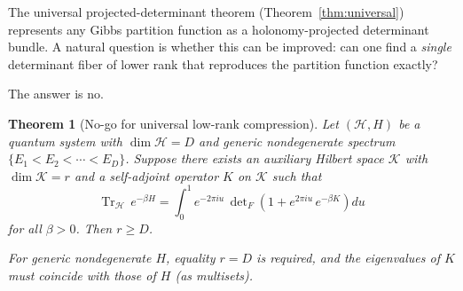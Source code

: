 \documentclass[12pt]{article}
\theoremstyle{plain}
\newtheorem{theorem}{Theorem}[section]
\theoremstyle{definition}
\numberwithin{equation}{section}
\DeclareMathOperator{\Tr}{Tr}
\begin{document}
The universal projected-determinant theorem (Theorem~\ref{thm:universal})
represents any Gibbs partition function as a holonomy-projected
determinant bundle.  A natural question is whether this can be
improved: can one find a \emph{single} determinant fiber of
lower rank that reproduces the partition function exactly?

The answer is no.

\begin{theorem}[No-go for universal low-rank compression]\label{thm:nogo}
Let $(\mathcal{H},H)$ be a quantum system with $\dim\mathcal{H}=D$
and generic nondegenerate spectrum $\{E_1<E_2<\cdots<E_D\}$.
Suppose there exists an auxiliary Hilbert space $\mathcal{K}$ with
$\dim\mathcal{K}=r$ and a self-adjoint operator $K$ on $\mathcal{K}$
such that
\begin{equation}\label{eq:lowrank}
\Tr_{\mathcal{H}}\,e^{-\beta H}
= \int_0^1 e^{-2\pi iu}\,
\det\nolimits_F\!\left(1+e^{2\pi iu}\,e^{-\beta K}\right)du
\end{equation}
for all $\beta>0$.  Then $r\geq D$.

For generic nondegenerate $H$, equality $r=D$ is required, and the
eigenvalues of $K$ must coincide with those of $H$ (as multisets).
\end{theorem}
\end{document}

